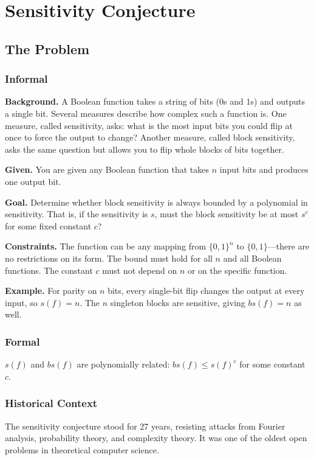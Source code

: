 \let\LocalMacro\relax

\chapter{Sensitivity Conjecture}

\section{The Problem}

\subsection{Informal}

\textbf{Background.} A Boolean function takes a string of bits (0s and 1s) and outputs a single bit. Several measures describe how complex such a function is. One measure, called sensitivity, asks: what is the most input bits you could flip at once to force the output to change? Another measure, called block sensitivity, asks the same question but allows you to flip whole blocks of bits together.

\textbf{Given.} You are given any Boolean function that takes $n$ input bits and produces one output bit.

\textbf{Goal.} Determine whether block sensitivity is always bounded by a polynomial in sensitivity. That is, if the sensitivity is $s$, must the block sensitivity be at most $s^c$ for some fixed constant $c$?

\textbf{Constraints.} The function can be any mapping from $\{0,1\}^n$ to $\{0,1\}$---there are no restrictions on its form. The bound must hold for all $n$ and all Boolean functions. The constant $c$ must not depend on $n$ or on the specific function.

\textbf{Example.} For parity on $n$ bits, every single-bit flip changes the output at every input, so $s(f)=n$. The $n$ singleton blocks are sensitive, giving $bs(f)=n$ as well.

\subsection{Formal}
\begin{conjecture}
$s(f)$ and $bs(f)$ are polynomially related: $bs(f) \le s(f)^c$ for some constant $c$.
\end{conjecture}

\subsection{Historical Context}
The sensitivity conjecture stood for 27 years, resisting attacks from Fourier analysis, probability theory, and complexity theory. It was one of the oldest open problems in theoretical computer science.

